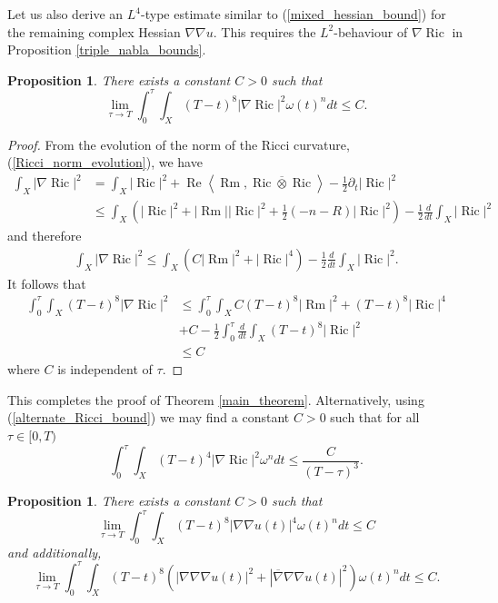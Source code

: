 \documentclass[12pt]{article}
\newtheorem{proposition}[theorem]{Proposition}
\numberwithin{equation}{section}
\renewcommand{\d}{\partial}
\DeclareMathOperator{\Ric}{Ric}
\DeclareMathOperator{\Rm}{Rm}
\DeclareMathOperator{\Real}{Re}
\newcommand{\oo}[1]{\overline{#1}}
\newcommand{\ip}[1]{\left\langle#1\right\rangle}
\begin{document}
\noindent Let us also derive an $L^4$-type estimate similar to (\ref{mixed_hessian_bound}) for the remaining complex Hessian $\nabla \nabla u$. This requires the $L^2$-behaviour of $\nabla \Ric$ in Proposition \ref{triple_nabla_bounds}.

\begin{proposition}
There exists a constant $C > 0$ such that 
\begin{equation*}
    \lim_{\tau \to T}\int_0^\tau \int_X (T-t)^8|\nabla \Ric|^2 \omega(t)^n dt \leq C.
\end{equation*}
\end{proposition}

\begin{proof}
From the evolution of the norm of the Ricci curvature, (\ref{Ricci_norm_evolution}), we have
\begin{align*}
    \int_X |\nabla \Ric|^2 &= \int_X |\Ric|^2 + \Real\ip{\Rm, \oo{\Ric \otimes \Ric}} - \frac{1}{2}  \d_t |\Ric|^2\\
    &\leq \int_X \left(|\Ric|^2 + |\Rm||\Ric|^2 +\frac{1}{2}(-n-R)|\Ric|^2\right) -\frac{1}{2}\frac{d}{dt}\int_X |\Ric|^2
\end{align*}
and therefore
\begin{align*}
    \int_X |\nabla \Ric|^2 \leq \int_X \left(C|\Rm|^2 + |\Ric|^4\right) -\frac{1}{2} \frac{d}{dt}\int_X |\Ric|^2.
\end{align*}
It follows that
\begin{align*}
    \int_0^\tau\int_X (T-t)^8 |\nabla \Ric|^2 &\leq \int_0^\tau\int_X  C(T-t)^8|\Rm|^2 + (T-t)^8 |\Ric|^4\\
    &+C- \frac{1}{2}\int_0^\tau \frac{d}{dt} \int_X (T-t)^8 |\Ric|^2\\
    &\leq C
\end{align*}
where $C$ is independent of $\tau$.
\end{proof}

\noindent This completes the proof of Theorem \ref{main_theorem}.
Alternatively, using (\ref{alternate_Ricci_bound}) we may find a constant $C > 0$ such that for all $\tau \in [0,T)$
\begin{equation}\label{alternate_gradient_Ricci_bound}
    \int_0^\tau \int_X (T-t)^4|\nabla \Ric|^2 \omega^n dt \leq \frac{C}{(T-\tau)^3}.
\end{equation}

\begin{proposition}
There exists a constant $C > 0$ such that
\begin{equation*}
    \lim_{\tau \to T} \int_0^\tau \int_X (T-t)^8|\nabla \nabla u(t)|^4 \omega(t)^n dt \leq C
\end{equation*}
and additionally,
\begin{equation*}
    \lim_{\tau \to T} \int_0^\tau \int_X(T-t)^8 (|\nabla \nabla \nabla u(t)|^2 + |\oo{\nabla} \nabla \nabla u(t)|^2) \omega(t)^n dt \leq C.
\end{equation*}
\end{proposition}
\end{document}
